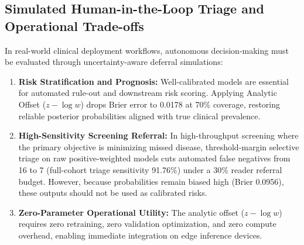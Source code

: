 \documentclass[preprint,12pt]{elsarticle}
\begin{document}
\subsection{Simulated Human-in-the-Loop Triage and Operational Trade-offs}
In real-world clinical deployment workflows, autonomous decision-making must be evaluated through uncertainty-aware deferral simulations:
\begin{enumerate}
    \item \textbf{Risk Stratification and Prognosis:} Well-calibrated models are essential for automated rule-out and downstream risk scoring. Applying Analytic Offset ($z - \log w$) drops Brier error to 0.0178 at 70\% coverage, restoring reliable posterior probabilities aligned with true clinical prevalence.
    \item \textbf{High-Sensitivity Screening Referral:} In high-throughput screening where the primary objective is minimizing missed disease, threshold-margin selective triage on raw positive-weighted models cuts automated false negatives from 16 to 7 (full-cohort triage sensitivity 91.76\%) under a 30\% reader referral budget. However, because probabilities remain biased high (Brier 0.0956), these outputs should not be used as calibrated risks.
    \item \textbf{Zero-Parameter Operational Utility:} The analytic offset ($z - \log w$) requires zero retraining, zero validation optimization, and zero compute overhead, enabling immediate integration on edge inference devices.
\end{enumerate}
\end{document}
